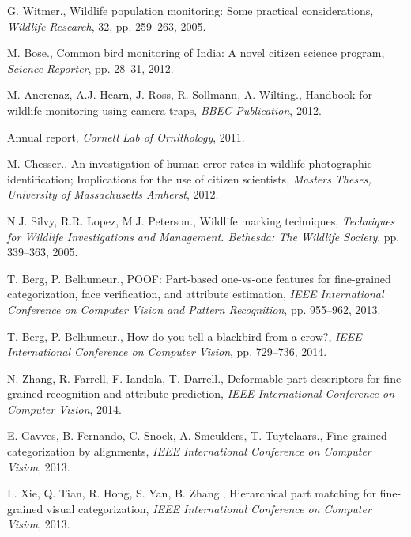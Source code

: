 \documentclass{article}
\begin{document}
\begin{thebibliography}{100}


G. Witmer., 
Wildlife population monitoring: Some practical considerations,
\emph{Wildlife Research}, 32, pp. 259--263, 2005. 

M. Bose., 
Common bird monitoring of India: A novel citizen science program, 
\emph{Science Reporter}, pp. 28--31, 2012. 

M. Ancrenaz, A.J. Hearn, J. Ross, R. Sollmann, A. Wilting., 
Handbook for wildlife monitoring using camera-traps,
\emph{BBEC Publication}, 2012. 

Annual report,
\emph{Cornell Lab of Ornithology}, 2011.

M. Chesser., 
An investigation of human-error rates in wildlife photographic identification; 
Implications for the use of citizen scientists, 
\emph{Masters Theses, University of Massachusetts Amherst}, 2012. 

N.J. Silvy, R.R. Lopez, M.J. Peterson., 
Wildlife marking techniques, 
\emph{Techniques for Wildlife Investigations and Management. Bethesda: The
Wildlife Society},
pp. 339--363, 2005. 

T. Berg, P. Belhumeur., 
POOF: Part-based one-vs-one features for fine-grained categorization, 
face verification, and attribute estimation,
\emph{IEEE International Conference on Computer Vision and Pattern Recognition},
pp. 955--962, 2013. 

T. Berg, P. Belhumeur., 
How do you tell a blackbird from a crow?, 
\emph{IEEE International Conference on Computer Vision},
pp. 729--736, 2014. 

N. Zhang, R. Farrell, F. Iandola, T. Darrell., 
Deformable part descriptors for fine-grained recognition and attribute prediction, 
\emph{IEEE International Conference on Computer Vision}, 2014. 

E. Gavves, B. Fernando, C. Snoek, A. Smeulders, T. Tuytelaars., 
Fine-grained categorization by alignments, 
\emph{IEEE International Conference on Computer Vision}, 2013. 

L. Xie, Q. Tian, R. Hong, S. Yan, B. Zhang., 
Hierarchical part matching for fine-grained visual categorization, 
\emph{IEEE International Conference on Computer Vision}, 2013. 


\end{thebibliography}
\end{document}
